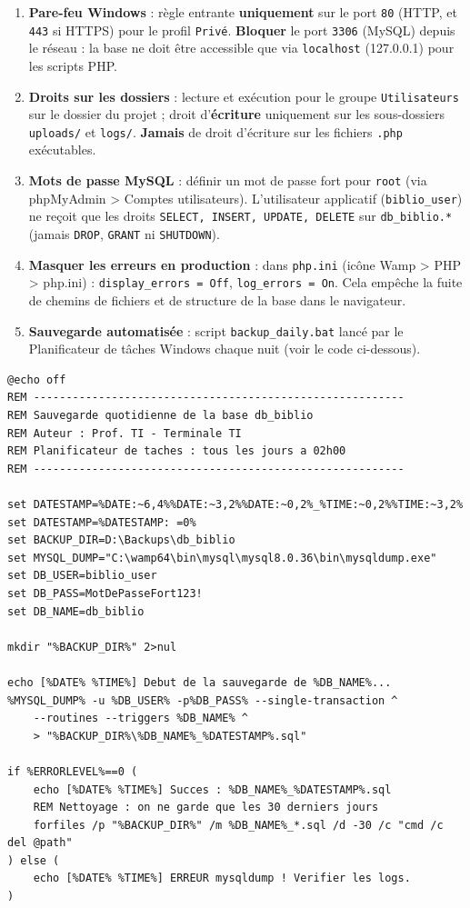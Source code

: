 \documentclass[11pt]{article}
\begin{document}
\begin{propriete}
\begin{enumerate}
    \item \textbf{Pare-feu Windows} : règle entrante \textbf{uniquement} sur le port \texttt{80} (HTTP, et \texttt{443} si HTTPS) pour le profil \texttt{Privé}. \textbf{Bloquer} le port \texttt{3306} (MySQL) depuis le réseau : la base ne doit être accessible que via \texttt{localhost} (127.0.0.1) pour les scripts PHP.
    \item \textbf{Droits sur les dossiers} : lecture et exécution pour le groupe \texttt{Utilisateurs} sur le dossier du projet ; droit d'\textbf{écriture} uniquement sur les sous-dossiers \texttt{uploads/} et \texttt{logs/}. \textbf{Jamais} de droit d'écriture sur les fichiers \texttt{.php} exécutables.
    \item \textbf{Mots de passe MySQL} : définir un mot de passe fort pour \texttt{root} (via phpMyAdmin \textgreater{} Comptes utilisateurs). L'utilisateur applicatif (\texttt{biblio\_user}) ne reçoit que les droits \texttt{SELECT, INSERT, UPDATE, DELETE} sur \texttt{db\_biblio.*} (jamais \texttt{DROP}, \texttt{GRANT} ni \texttt{SHUTDOWN}).
    \item \textbf{Masquer les erreurs en production} : dans \texttt{php.ini} (icône Wamp \textgreater{} PHP \textgreater{} php.ini) : \texttt{display\_errors = Off}, \texttt{log\_errors = On}. Cela empêche la fuite de chemins de fichiers et de structure de la base dans le navigateur.
    \item \textbf{Sauvegarde automatisée} : script \texttt{backup\_daily.bat} lancé par le Planificateur de tâches Windows chaque nuit (voir le code ci-dessous).
\end{enumerate}
\end{propriete}

\begin{lstlisting}
@echo off
REM ---------------------------------------------------------
REM Sauvegarde quotidienne de la base db_biblio
REM Auteur : Prof. TI - Terminale TI
REM Planificateur de taches : tous les jours a 02h00
REM ---------------------------------------------------------

set DATESTAMP=%DATE:~6,4%%DATE:~3,2%%DATE:~0,2%_%TIME:~0,2%%TIME:~3,2%
set DATESTAMP=%DATESTAMP: =0%
set BACKUP_DIR=D:\Backups\db_biblio
set MYSQL_DUMP="C:\wamp64\bin\mysql\mysql8.0.36\bin\mysqldump.exe"
set DB_USER=biblio_user
set DB_PASS=MotDePasseFort123!
set DB_NAME=db_biblio

mkdir "%BACKUP_DIR%" 2>nul

echo [%DATE% %TIME%] Debut de la sauvegarde de %DB_NAME%...
%MYSQL_DUMP% -u %DB_USER% -p%DB_PASS% --single-transaction ^
    --routines --triggers %DB_NAME% ^
    > "%BACKUP_DIR%\%DB_NAME%_%DATESTAMP%.sql"

if %ERRORLEVEL%==0 (
    echo [%DATE% %TIME%] Succes : %DB_NAME%_%DATESTAMP%.sql
    REM Nettoyage : on ne garde que les 30 derniers jours
    forfiles /p "%BACKUP_DIR%" /m %DB_NAME%_*.sql /d -30 /c "cmd /c del @path"
) else (
    echo [%DATE% %TIME%] ERREUR mysqldump ! Verifier les logs.
)
\end{lstlisting}
\end{document}
